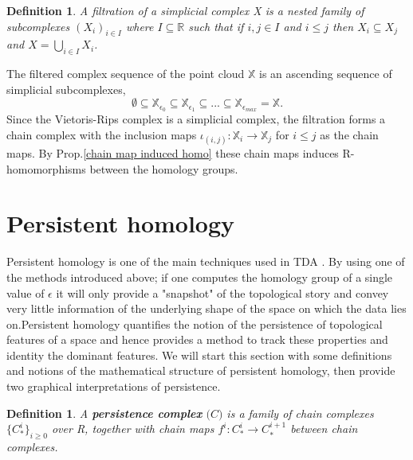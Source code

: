 \documentclass{article}
\newcommand{\be}{\begin{equation}}
\newcommand{\ee}{\end{equation}}
\newtheorem{definition}[theorem]{Definition}
\begin{document}
\begin{definition}A filtration of a simplicial complex X is a nested family of subcomplexes $(X_{i})_{i \in I}$ where $I \subseteq \mathbb{R}$ such that if $i,j \in I$ and $i \leq j$ then $X_{i} \subseteq X_{j}$ and $X = \bigcup_{i\in I} X_{i}$.
\end{definition}
The filtered complex sequence of the point cloud $\mathbb{X}$ is an ascending sequence of simplicial subcomplexes,
\be
\emptyset \subseteq \mathbb{X}_{\epsilon_0} \subseteq \mathbb{X}_{\epsilon_1} \subseteq ... \subseteq \mathbb{X}_{\epsilon_{max}} = \mathbb{X}.
\ee
Since the Vietoris-Rips complex is a simplicial complex, the filtration forms a chain complex with the inclusion maps $\iota_{(i,j)}: \mathbb{X}_{i} \to \mathbb{X}_{j} $ for $i\leq j$ as the chain maps. By Prop.\ref{chain map induced homo} these chain maps induces R-homomorphisms between the homology groups.



\section{Persistent homology}
Persistent homology is one of the main techniques used in TDA \cite{akingbade2023topological}\cite{ravishanker2019topological}\cite{AZComputePH}\cite{CarlssonTDAappli}. By using one of the methods introduced above; if one computes the homology group of a single value of $\epsilon$ it will only provide a "snapshot" of the topological story and convey very little information of the underlying shape of the space on which the data lies on\cite{CarlssonTDAappli}.Persistent homology quantifies the notion of the persistence of topological features of a space and hence provides a method to track these properties and identity the dominant features. We will start this section with some definitions and notions of the mathematical structure of persistent homology, then provide two graphical interpretations of persistence. 
\begin{definition}
A \textbf{persistence complex} $\mathfrak(C)$ is a family of chain complexes $\{C^{i}_{*}\}_{i\geq 0}$ over R, together with chain maps $f^{i} : C^{i}_{*} \rightarrow C^{i+1}_{*}$ between chain complexes.
\end{definition}
\end{document}
